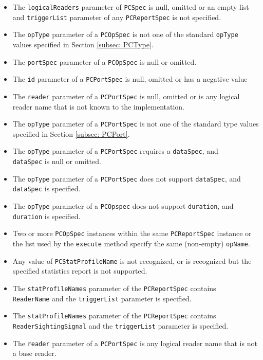 \documentclass[11pt,a4paper,oneside]{article}
\begin{document}
\begin{itemize}
\item	The \texttt{logicalReaders} parameter of \texttt{PCSpec} is null, omitted or an empty list and \texttt{triggerList} parameter of any \texttt{PCReportSpec} is not specified.
\item	The \texttt{opType} parameter of a \texttt{PCOpSpec} is not one of the standard \texttt{opType} values specified in Section \ref{subsec: PCType}.
\item	The \texttt{portSpec} parameter of a \texttt{PCOpSpec} is null or omitted.
\item	The \texttt{id} parameter of a \texttt{PCPortSpec} is null, omitted or has a negative value
\item	The \texttt{reader} parameter of a \texttt{PCPortSpec} is null, omitted or is any logical reader name that is not known to the implementation.
\item	The \texttt{opType} parameter of a \texttt{PCPortSpec} is not one of the standard type values specified in Section \ref{subsec: PCPort}.
\item	The \texttt{opType} parameter of a \texttt{PCPortSpec} requires a \texttt{dataSpec}, and \ifpdf\\\fi\texttt{dataSpec} is null or omitted.
\item	The \texttt{opType} parameter of a \texttt{PCPortSpec} does not support \texttt{dataSpec}, and \texttt{dataSpec} is specified.
\item	The \texttt{opType} parameter of a \texttt{PCOpspec} does not support \texttt{duration}, and \texttt{duration} is specified.
\item	Two or more \texttt{PCOpSpec} instances within the same \texttt{PCReportSpec} instance or the list used by the \texttt{execute} method specify the same (non-empty) \texttt{opName}.
\item	Any value of \texttt{PCStatProfileName} is not recognized, or is recognized but the specified statistics report is not supported.
\item	The \texttt{statProfileNames} parameter of the \texttt{PCReportSpec} contains \ifpdf\\\fi\texttt{ReaderName} and the \texttt{triggerList} parameter is specified.
\item	The \texttt{statProfileNames} parameter of the \texttt{PCReportSpec} contains \ifpdf\\\fi\texttt{ReaderSightingSignal} and the \texttt{triggerList} parameter is specified.
\item	The \texttt{reader} parameter of a \texttt{PCPortSpec} is any logical reader name that is not a base reader.
\end{itemize}
\end{document}
